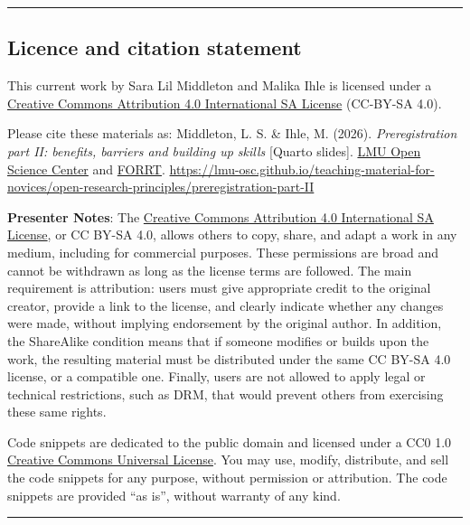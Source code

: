 \documentclass[
  letterpaper,
  DIV=11,
  numbers=noendperiod]{scrartcl}
\begin{document}
\begin{center}\rule{0.5\linewidth}{0.5pt}\end{center}

\subsection{Licence and citation
statement}\label{licence-and-citation-statement}

This current work by Sara Lil Middleton and Malika Ihle is licensed
under a
\href{https://creativecommons.org/licenses/by-sa/4.0/deed.en}{Creative
Commons Attribution 4.0 International SA License} (CC-BY-SA 4.0).

Please cite these materials as: Middleton, L. S. \& Ihle, M. (2026).
\emph{Preregistration part II: benefits, barriers and building up
skills} {[}Quarto slides{]}. \href{https://www.osc.lmu.de/}{LMU Open
Science Center} and \href{https://forrt.org/}{FORRT}.
\url{https://lmu-osc.github.io/teaching-material-for-novices/open-research-principles/preregistration-part-II}

\textbf{Presenter Notes}: The
\href{https://creativecommons.org/licenses/by-sa/4.0/deed.en}{Creative
Commons Attribution 4.0 International SA License}, or CC BY-SA 4.0,
allows others to copy, share, and adapt a work in any medium, including
for commercial purposes. These permissions are broad and cannot be
withdrawn as long as the license terms are followed. The main
requirement is attribution: users must give appropriate credit to the
original creator, provide a link to the license, and clearly indicate
whether any changes were made, without implying endorsement by the
original author. In addition, the ShareAlike condition means that if
someone modifies or builds upon the work, the resulting material must be
distributed under the same CC BY-SA 4.0 license, or a compatible one.
Finally, users are not allowed to apply legal or technical restrictions,
such as DRM, that would prevent others from exercising these same
rights.

Code snippets are dedicated to the public domain and licensed under a
CC0 1.0
\href{https://creativecommons.org/publicdomain/zero/1.0/}{Creative
Commons Universal License}. You may use, modify, distribute, and sell
the code snippets for any purpose, without permission or attribution.
The code snippets are provided ``as is'', without warranty of any kind.

\begin{center}\rule{0.5\linewidth}{0.5pt}\end{center}
\end{document}
